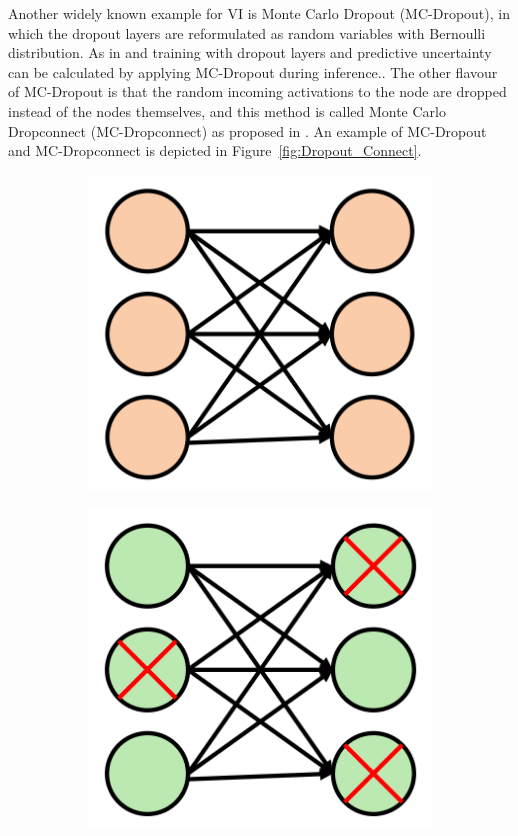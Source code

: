     Another widely known example for VI is Monte Carlo Dropout (MC-Dropout), in which the dropout layers are reformulated as random variables with Bernoulli distribution.
    As in \cite{bhandary2020evaluating} and \cite{gawlikowski2021survey} training with dropout layers and predictive uncertainty can be calculated by applying MC-Dropout during inference..
    The other flavour of MC-Dropout is that the random incoming activations to the node are dropped instead of the nodes themselves, and this method is called Monte Carlo Dropconnect (MC-Dropconnect) as proposed in \cite{gawlikowski2021survey}.
    An example of MC-Dropout and MC-Dropconnect is depicted in Figure~\ref{fig:Dropout_Connect}.
    \begin{figure}[htbp]
        \begin{subfigure}{0.33\textwidth}
            \centering
            \includegraphics[scale=0.33]{images/BaseNW_SOTA.png}
            \caption{}
        \end{subfigure}
        \begin{subfigure}{0.33\textwidth}
            \centering
            \includegraphics[scale=0.33]{images/Dropout_SOTA.png}

\end{subfigure}
\end{figure}
